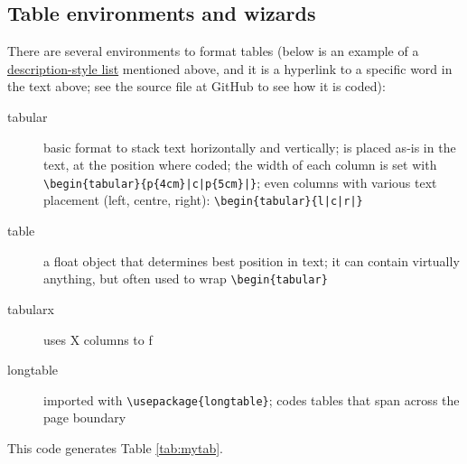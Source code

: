 \documentclass[a4paper,11pt]{article}
\begin{document}
\medskip

\subsection{Table environments and wizards}

There are several environments to format tables (below is an example of a \hyperlink{ex:desc}{description-style list} mentioned above, and it is a hyperlink to a specific word in the text above; see the source file at GitHub to see how it is coded):
\setlength\fboxsep{3pt} %
\setlength\fboxrule{1pt} %
\begin{description}
	\item[tabular] basic format to stack text horizontally and vertically; is placed as-is in the text, at the position where coded; the width of each column is set with \verb-\begin{tabular}{p{4cm}|c|p{5cm}|}-; even columns with various text placement (left, centre, right): \verb-\begin{tabular}{l|c|r|}-
	\item[table] a float object tha\usetikzlibrary{calc, positioning, shapes.arrows}t determines best position in text; it can contain virtually anything, but often used to wrap \verb|\begin{tabular}|
	\item[tabularx] uses X columns to f%
	\item[longtable] imported with \verb|\usepackage{longtable}|; codes tables that span across the page boundary

\end{description}

This code generates Table \ref{tab:mytab}.
\end{document}
